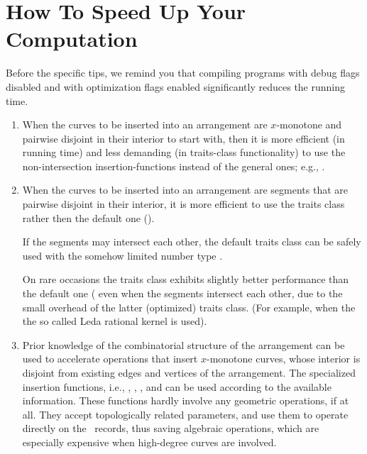 \section{How To Speed Up Your Computation\label{arr_sec:tips}}
Before the specific tips, we remind you that compiling programs with
debug flags disabled and with optimization flags enabled significantly
reduces the running time.

\begin{enumerate}
\item
When the curves to be inserted into an arrangement are $x$-monotone
and pairwise disjoint in their interior to start with, then it is more
efficient (in running time) and less demanding (in traits-class
functionality) to use the non-intersection insertion-functions instead
of the general ones; e.g., .

\item
When the curves to be inserted into an arrangement are segments that
are pairwise disjoint in their interior, it is more efficient to use
the traits class  rather then
the default one ().

If the segments may intersect each other, the default traits class
 can be safely used with the somehow limited
number type .

On rare occasions the traits class 
exhibits slightly better performance than the default one
(
even when the segments intersect each other, due to the small overhead
of the latter (optimized) traits class. (For example, when the the so
called {\sc Leda} rational kernel is used).

\item
Prior knowledge of the combinatorial structure of the arrangement can
be used to accelerate operations that insert $x$-monotone curves,
whose interior is disjoint from existing edges and vertices of the
arrangement. The specialized insertion functions, i.e., 
, , 
, and 
can be used according to the available information. These functions
hardly involve any geometric operations, if at all. They accept
topologically related parameters, and use them to operate directly on
the \dcel\ records, thus saving algebraic operations, which are
especially expensive when high-degree curves are involved.


\end{enumerate}

